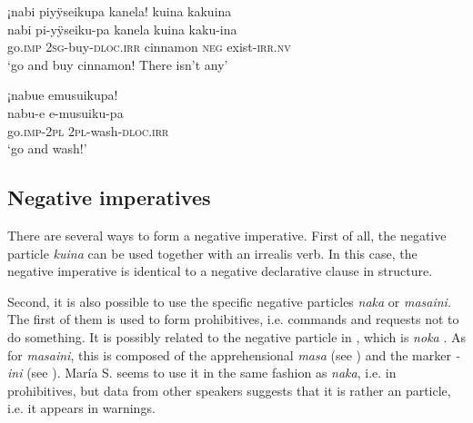 \ea\label{ex:nabi-9}
\begingl
\glpreamble ¡nabi piyÿseikupa kanela! kuina kakuina\\
\gla nabi pi-yÿseiku-pa kanela kuina kaku-ina\\
\glb go.\textsc{imp} 2\textsc{sg}-buy-\textsc{dloc.irr} cinnamon \textsc{neg} exist-\textsc{irr.nv}\\
\glft ‘go and buy cinnamon! There isn’t any’
\endgl
\trailingcitation{[jxx-e190210s-01]}
\xe

\ea\label{ex:nabi-11}
\begingl
\glpreamble ¡nabue emusuikupa!\\
\gla nabu-e e-musuiku-pa\\
\glb go.\textsc{imp}-2\textsc{pl} 2\textsc{pl}-wash-\textsc{dloc.irr}\\
\glft ‘go and wash!’
\endgl
\trailingcitation{[jxx-e190210s-01]}
\xe
{}



\subsection{Negative imperatives}\label{sec:Prohibitives}

There are several ways to form a negative imperative. First of all, the negative particle \textit{kuina} can be used together with an irrealis verb. In this case, the negative imperative is identical to a negative declarative clause in structure. 

Second, it is also possible to use the specific negative particles \textit{naka} or \textit{masaini}. The first of them is used to form prohibitives, i.e. commands and requests not to do something. It is possibly related to the negative particle in , which is \textit{noka} \citep[cf.][338]{Danielsen2007}. As for \textit{masaini}, this is composed of the apprehensional  \textit{masa} (see ) and the  marker \textit{-ini} (see ). María S. seems to use it in the same fashion as \textit{naka}, i.e. in prohibitives, but data from other speakers suggests that it is rather an  particle, i.e. it appears in warnings.

